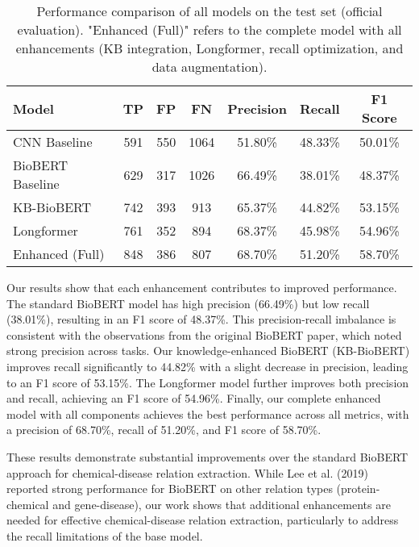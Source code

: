 \documentclass{amia}
\begin{document}
\begin{table}[H]
\begin{center}
\begin{tabular}{|l|c|c|c|c|c|c|}
\hline
\textbf{Model} & \textbf{TP} & \textbf{FP} & \textbf{FN} & \textbf{Precision} & \textbf{Recall} & \textbf{F1 Score} \\
\hline
CNN Baseline & 591 & 550 & 1064 & 51.80\% & 48.33\% & 50.01\% \\
\hline
BioBERT Baseline & 629 & 317 & 1026 & 66.49\% & 38.01\% & 48.37\% \\
\hline
KB-BioBERT & 742 & 393 & 913 & 65.37\% & 44.82\% & 53.15\% \\
\hline
Longformer & 761 & 352 & 894 & 68.37\% & 45.98\% & 54.96\% \\
\hline
Enhanced (Full) & 848 & 386 & 807 & 68.70\% & 51.20\% & 58.70\% \\
\hline
\end{tabular}
\end{center}
\caption{Performance comparison of all models on the test set (official evaluation). "Enhanced (Full)" refers to the complete model with all enhancements (KB integration, Longformer, recall optimization, and data augmentation).}
\label{tab:performance}
\end{table}

Our results show that each enhancement contributes to improved performance. The standard BioBERT model has high precision (66.49\%) but low recall (38.01\%), resulting in an F1 score of 48.37\%. This precision-recall imbalance is consistent with the observations from the original BioBERT paper, which noted strong precision across tasks. Our knowledge-enhanced BioBERT (KB-BioBERT) improves recall significantly to 44.82\% with a slight decrease in precision, leading to an F1 score of 53.15\%. The Longformer model further improves both precision and recall, achieving an F1 score of 54.96\%. Finally, our complete enhanced model with all components achieves the best performance across all metrics, with a precision of 68.70\%, recall of 51.20\%, and F1 score of 58.70\%.

These results demonstrate substantial improvements over the standard BioBERT approach for chemical-disease relation extraction. While Lee et al. (2019) reported strong performance for BioBERT on other relation types (protein-chemical and gene-disease), our work shows that additional enhancements are needed for effective chemical-disease relation extraction, particularly to address the recall limitations of the base model.
\end{document}
